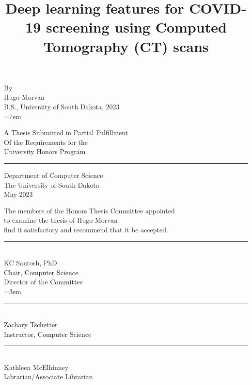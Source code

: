 \documentclass[12pt, letterpaper]{article}
\title{\textbf{Deep learning features for COVID-19 screening using Computed Tomography (CT)
scans}}
\date{}
\begin{document}
\pagestyle{empty}
\maketitle

\doublespacing
\begin{center}


By \\
Hugo Morvan \\
B.S., University of South Dakota, 2023 \\

\bigskipamount=7em
\bigskip


A Thesis Submitted in Partial Fulfillment \\
Of the Requirements for the  \\
University Honors Program \\

\rule{\linewidth}{1pt} 

Department of Computer Science \\
The University of South Dakota \\
May 2023 \\

\newpage

The members of the Honors Thesis Committee appointed \\
to examine the thesis of Hugo Morvan \\
find it satisfactory and recommend that it be accepted. \\

\bigskip
\rule{\linewidth}{1pt} \\
KC Santosh, PhD \\
Chair, Computer Science \\
Director of the Committee  \\

\medskipamount=3em
\medskip
\rule{\linewidth}{1pt} \\
Zachary Tschetter \\
Instructor, Computer Science \\

\medskip
\rule{\linewidth}{1pt} \\
Kathleen McElhinney \\
Librarian/Associate Librarian\\


\end{center}
\end{document}
